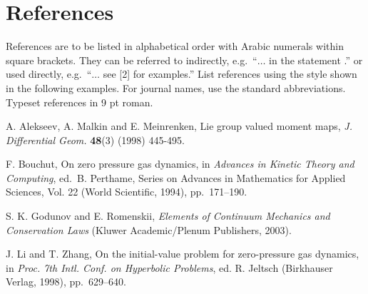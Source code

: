 \documentclass{ws-ijac}
\begin{document}
\section*{References}

References are to be listed in alphabetical order with Arabic numerals
within square brackets. They can be referred to indirectly,
e.g.~``$\ldots$ in the statement \cite{2}.'' or used directly,
e.g.~``$\ldots$ see [2] for examples.'' List references using the
style shown in the following examples. For journal names, use the
standard abbreviations.  Typeset references in 9 pt roman.

\begin{thebibliography}{0}

 A. Alekseev, A. Malkin and E. Meinrenken, Lie group valued
moment maps, {\it J. Differential Geom.} {\bf 48}(3) (1998) 445-495.

 F. Bouchut, On zero pressure gas dynamics, in
{\it Advances in Kinetic Theory and Computing}, ed.~B. Perthame,
Series on Advances in Mathematics for Applied Sciences, Vol. 22 (World Scientific, 1994),
pp.~171--190.

 S. K. Godunov and E. Romenskii, {\it Elements of Continuum
Mechanics and Conservation Laws} (Kluwer Academic/Plenum Publishers,
2003).

 J. Li and T. Zhang, On the initial-value problem for
zero-pressure gas dynamics, in {\it Proc. 7th Intl. Conf. on Hyperbolic
Problems}, ed. R. Jeltsch (Birkhauser Verlag, 1998), pp.~629--640.

\end{thebibliography}
\end{document}
